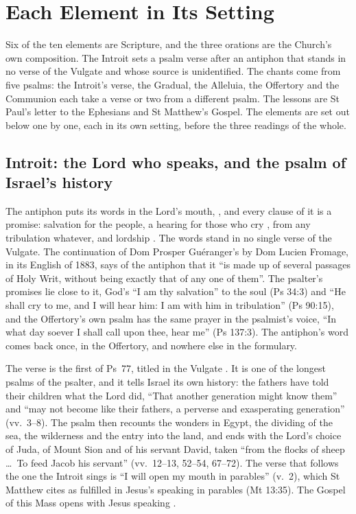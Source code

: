 \section{Each Element in Its Setting}
\label{sec:each-element}

Six of the ten elements are Scripture, and the three orations are the
Church's own composition. The Introit sets a psalm verse after an antiphon that
stands in no verse of the Vulgate and whose source is unidentified. The chants
come from five psalms: the Introit's verse, the Gradual, the Alleluia, the
Offertory and the Communion each take a verse or two from a different psalm.
The lessons are St Paul's letter to the Ephesians and St Matthew's Gospel. The
elements are set out below one by one, each in its own setting, before the
three readings of the whole.

\subsection{Introit: the Lord who speaks, and the psalm of Israel's history}

The antiphon puts its words in the Lord's mouth, , and
every clause of it is a promise: salvation for the people, a hearing for those
who cry , from any tribulation whatever, and
lordship . The words stand
in no single verse of the Vulgate. The continuation of Dom Prosper Guéranger's
 by Dom Lucien Fromage, in its English of 1883, says
of the antiphon that
it ``is made up of several passages of Holy Writ, without being exactly that of
any one of them''. The psalter's promises lie close to it, God's ``I am thy
salvation'' to the soul (Ps 34:3) and ``He shall cry to me, and I will hear
him: I am with him in tribulation'' (Ps 90:15), and the Offertory's own psalm
has the same prayer in the psalmist's voice, ``In what day soever I shall call
upon thee, hear me'' (Ps 137:3). The antiphon's word  comes
back once, in the Offertory, and nowhere else in the formulary.

The verse is the first of Ps~77, titled in the Vulgate . It is one of the longest psalms of the psalter, and it tells Israel its
own history: the fathers have told their children what the Lord did, ``That
another generation might know them'' and ``may not become like their fathers, a
perverse and exasperating generation'' (vv.~3--8). The psalm then recounts the
wonders in Egypt, the dividing of the sea, the wilderness and the entry into
the land, and ends with the Lord's choice of Juda, of Mount Sion and of his
servant David, taken ``from the flocks of sheep \dots\ To feed Jacob his
servant'' (vv.~12--13, 52--54, 67--72). The verse that follows the one the
Introit sings is ``I will open my mouth in parables'' (v.~2), which St Matthew
cites as fulfilled in Jesus's speaking in parables (Mt 13:35). The Gospel of
this Mass opens with Jesus speaking .

